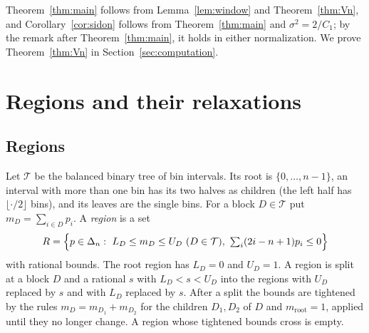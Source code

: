 \documentclass[11pt]{amsart}
\theoremstyle{definition}
\theoremstyle{remark}
\numberwithin{equation}{section}
\begin{document}
Theorem~\ref{thm:main} follows from Lemma~\ref{lem:window} and Theorem~\ref{thm:Vn}, and Corollary~\ref{cor:sidon} follows from Theorem~\ref{thm:main} and $\sigma^2=2/C_1$; by the remark after Theorem~\ref{thm:main}, it holds in either normalization. We prove Theorem~\ref{thm:Vn} in Section~\ref{sec:computation}.

\section{Regions and their relaxations}\label{sec:bb}

\subsection{Regions} Let $\mathcal{T}$ be the balanced binary tree of bin intervals. Its root is $\{0,\dots,n-1\}$, an interval with more than one bin has its two halves as children (the left half has $\lfloor\cdot/2\rfloor$ bins), and its leaves are the single bins. For a block $D\in\mathcal{T}$ put $m_D=\sum_{i\in D}p_i$. A \emph{region} is a set
\[
R=\Bigl\{p\in\Delta_n:\ L_D\le m_D\le U_D\ (D\in\mathcal{T}),\ \textstyle\sum_i(2i-n+1)p_i\le0\Bigr\}
\]
with rational bounds. The root region has $L_D=0$ and $U_D=1$. A region is split at a block $D$ and a rational $s$ with $L_D<s<U_D$ into the regions with $U_D$ replaced by $s$ and with $L_D$ replaced by $s$. After a split the bounds are tightened by the rules $m_D=m_{D_1}+m_{D_2}$ for the children $D_1,D_2$ of $D$ and $m_{\mathrm{root}}=1$, applied until they no longer change. A region whose tightened bounds cross is empty.
\end{document}
